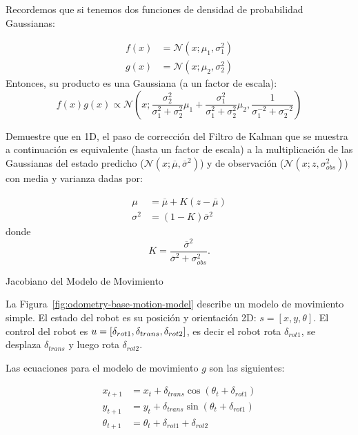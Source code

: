 \documentclass[tp]{lcc}
\begin{document}
    Recordemos que si tenemos dos funciones de densidad de probabilidad Gaussianas:
    
    \begin{align*}
        f(x) &= \mathcal{N}(x;\mu_{1},\sigma_{1}^{2})\\
        g(x) &= \mathcal{N}(x;\mu_{2},\sigma_{2}^{2})
    \end{align*}
%
    Entonces, su producto es una Gaussiana (a un factor de escala):
%
    \begin{equation*}
        f(x)g(x) \propto \mathcal{N} \left(x; \dfrac{\sigma_{2}^{2}}{\sigma_{1}^{2} + \sigma_{2}^{2}}\mu_{1} + \dfrac{\sigma_{1}^{2}}{\sigma_{1}^{2} + \sigma_{2}^{2}}\mu_{2}, \dfrac{1}{\sigma_{1}^{-2} + \sigma_{2}^{-2}} \right)
    \end{equation*}

    Demuestre que en 1D, el paso de corrección del Filtro de Kalman que se muestra a continuación es equivalente (hasta un factor de escala) a la multiplicación de las Gaussianas del estado predicho ($\mathcal{N}(x;\overline{\mu},\overline{\sigma}^{2})$) y de observación ($\mathcal{N}(x;z, \sigma_{obs}^{2})$) con media y varianza dadas por:
    
    \begin{align*}
        \mu &= \overline{\mu} + K (z - \overline{\mu})\\
        \sigma^{2} &= (1 - K) \overline{\sigma}^{2}
    \end{align*}
%
    donde 
    \begin{equation*}
        K = \dfrac{\overline{\sigma}^{2}}{\overline{\sigma}^{2}+\sigma_{obs}^{2}}.
    \end{equation*}
	
	\ejercicio Jacobiano del Modelo de Movimiento
    \label{exercise:jacobian}
    
    La Figura~\ref{fig:odometry-base-motion-model} describe un modelo de movimiento simple. El estado del robot es su posición y orientación 2D: $s = [x, y, \theta]$. El control del robot es $u = [\delta_{rot1}, \delta_{trans}, \delta_{rot2}]$, es decir el robot rota $\delta_{rot1}$, se desplaza $\delta_{trans}$ y luego rota $\delta_{rot2}$.
    
    Las ecuaciones para el modelo de movimiento $g$ son las siguientes:
    
    \begin{align*}
        x_{t+1} &= x_{t} + \delta_{trans} \cos(\theta_{t} + \delta_{rot1})\\
        y_{t+1} &= y_{t} + \delta_{trans} \sin(\theta_{t} + \delta_{rot1})\\
        \theta_{t+1} &= \theta_{t} + \delta_{rot1} + \delta_{rot2}
    \end{align*}
\end{document}
